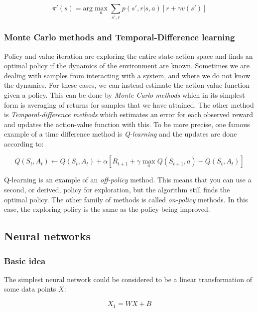 \begin{equation}
    \pi'(s) = \text{arg}\max_a \sum_{s', r} p(s', r|s, a) \left[r + \gamma v(s')\right]
\end{equation}

\subsubsection{Monte Carlo methods and Temporal-Difference learning}

Policy and value iteration are exploring the entire state-action space and
finds an optimal policy if the dynamics of the environment are known. Sometimes
we are dealing with samples from interacting with a system, and where we do not
know the dynamics. For these cases, we can instead estimate the action-value
function given a policy. This can be done by \textit{Monte Carlo methods} which
in its simplest form is averaging of returns for samples that we have attained.
The other method is \textit{Temporal-difference methods} which estimates an error
for each observed reward and updates the action-value function with this. To be
more precise, one famous example of a time difference method is
\textit{Q-learning} and the updates are done according to:

\begin{equation}
    Q(S_t, A_t) \leftarrow Q(S_t, A_t) + \alpha \left[ R_{t+1} + \gamma \max_a Q(S_{t+1}, a) - Q(S_t, A_t) \right]
\end{equation}

Q-learning is an example of an \textit{off-policy} method. This means that you
can use a second, or derived, policy for exploration, but the algorithm still
finds the optimal policy. The other family of methods is called
\textit{on-policy} methods. In this case, the exploring policy is the
same as the policy being improved.

\subsection{Neural networks}

\subsubsection{Basic idea}

The simplest neural network could be considered to be a linear transformation
of some data points $X$:

\begin{equation}
    X_1 = WX + B
\end{equation}

